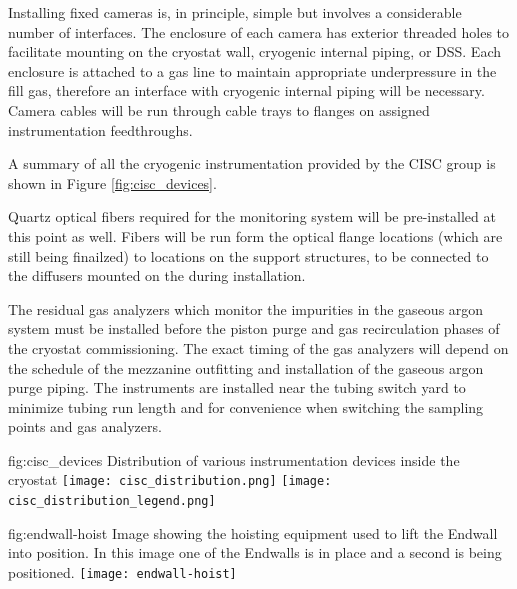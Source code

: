 Installing fixed cameras is, in principle, simple but involves a considerable number of interfaces. The enclosure of each camera has exterior threaded holes to facilitate mounting on the cryostat wall, cryogenic internal piping, or DSS. Each enclosure is attached to a gas line to maintain appropriate underpressure in the fill gas, therefore an interface with cryogenic internal piping will be necessary. Camera cables will be run through cable trays to flanges on assigned instrumentation feedthroughs. 

A summary of all the cryogenic instrumentation provided by the CISC group is shown in Figure \ref{fig:cisc_devices}. 

Quartz optical fibers required for the  monitoring system will be pre-installed at this point as well.  Fibers will be run form the optical flange locations (which are still being finailzed) to locations on the  support structures, to be connected to the diffusers mounted on the  during installation.

The residual gas analyzers which monitor the impurities in the gaseous argon system must be installed before the piston purge and gas recirculation phases of the cryostat commissioning. The exact timing of the gas analyzers will depend on the schedule of the mezzanine outfitting and installation of the gaseous argon purge piping. The instruments are installed near the tubing switch yard to minimize tubing run length and for convenience when switching the sampling points and gas analyzers. 

\begin{dunefigure}{fig:cisc_devices}
  {Distribution of various instrumentation devices inside the cryostat}
  \texttt{[image: cisc\_distribution.png]}
  \texttt{[image: cisc\_distribution\_legend.png]}
\end{dunefigure}

\begin{dunefigure}{fig:endwall-hoist}
  {Image showing the hoisting equipment used to lift the Endwall into position. In this image one of the Endwalls is in place and a second is being positioned.}
\texttt{[image: endwall-hoist]}
\end{dunefigure}

